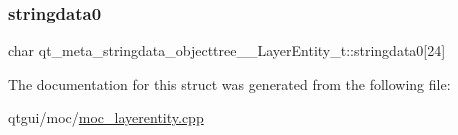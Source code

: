 \subsubsection{\texorpdfstring{stringdata0}{stringdata0}}
{\footnotesize\ttfamily char qt\+\_\+meta\+\_\+stringdata\+\_\+objecttree\+\_\+\+\_\+\+Layer\+Entity\+\_\+t\+::stringdata0\mbox{[}24\mbox{]}}



The documentation for this struct was generated from the following file\+:\begin{DoxyCompactItemize}
\item 
qtgui/moc/\mbox{\hyperlink{moc__layerentity_8cpp}{moc\+\_\+layerentity.\+cpp}}\end{DoxyCompactItemize}
